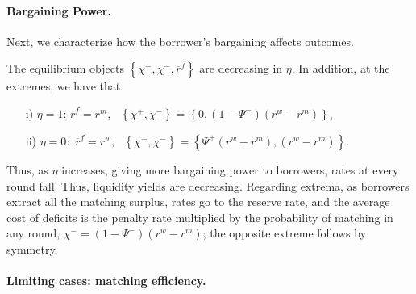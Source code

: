 \documentclass[12pt,american,english,notitlepage]{article}
\begin{document}
\paragraph{Bargaining Power.}

Next, we characterize how the borrower's bargaining affects outcomes.

\begin{proposition}\label{prop:derivatives.eta}\label{prop:bargaininglimit}
The equilibrium objects $\left\{ \chi^{+},\chi^{-},\overline{r}^{f}\right\} $ are decreasing in $\eta$. In addition, at the extremes, we have that
\begin{itemize}
\item [i)] $\eta=1$: $\overline{r}^{f}=r^{m},\text{ }\left\{ \chi^{+},\chi^{-}\right\} =\left\{ 0,(1-\Psi^{-})(r^{w}-r^{m})\right\} ,$
\item [ii)] $\eta=0:$ $\overline{r}^{f}=r^{w},\text{ }\left\{ \chi^{+},\chi^{-}\right\} =\left\{ \Psi^{+}(r^{w}-r^{m}),(r^{w}-r^{m})\right\} .$
\end{itemize}
\end{proposition}

Thus, as $\eta$ increases, giving more bargaining power to borrowers,
rates at every round fall. Thus, liquidity yields are decreasing.
Regarding extrema, as borrowers extract all the matching surplus,
rates go to the reserve rate, and the average cost of deficits is the
penalty rate multiplied by the probability of matching in any round,
$\chi^{-}=(1-\Psi^{-})(r^{w}-r^{m})$; the opposite extreme follows
by symmetry.

\paragraph{Limiting cases: matching efficiency.}
\end{document}
